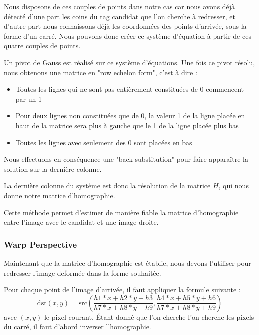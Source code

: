         Nous disposons de ces couples de points dans notre cas car nous avons déjà détecté d'une part les coins du tag candidat que l'on cherche à redresser, et d'autre part nous connaissons déjà les coordonnées des points d'arrivée, sous la forme d'un carré. Nous pouvons donc créer ce système d'équation à partir de ces quatre couples de points.

        Un pivot de Gauss est réalisé sur ce système d'équations. Une fois ce pivot résolu, nous obtenons une matrice en "row echelon form", c'est à dire :
    
        \begin{itemize}
            \item Toutes les lignes qui ne sont pas entièrement constituées de 0 commencent par un 1
            \item Pour deux lignes non constituées que de 0, la valeur 1 de la ligne placée en haut de la matrice sera plus à gauche que le 1 de la ligne placée plus bas
            \item Toutes les lignes avec seulement des 0 sont placées en bas
        \end{itemize}
    
        Nous effectuons en conséquence une "back substitution" pour faire apparaître la solution sur la dernière colonne.
    
        La dernière colonne du système est donc la résolution de la matrice $H$, qui nous donne notre matrice d'homographie.

        Cette méthode permet d'estimer de manière fiable la matrice d'homographie entre l'image avec le candidat et une image droite.

        
            \subsubsection{Warp Perspective}

            Maintenant que la matrice d'homographie est établie, nous devons l'utiliser pour redresser l'image deformée dans la forme souhaitée.

            Pour chaque point de l'image d'arrivée, il faut appliquer la formule suivante :
            \begin{equation*}
                \text{dst}\left(x,y\right) = \text{src}\left(\frac{h1*x + h2*y + h3}{h7*x + h8*y + h9}, \frac{h4*x + h5*y + h6}{h7*x + h8*y + h9}\right)
            \end{equation*}
            avec $(x, y)$ le pixel courant. Étant donné que l'on cherche l'on cherche les pixels du carré, il faut d'abord inverser l'homographie.


